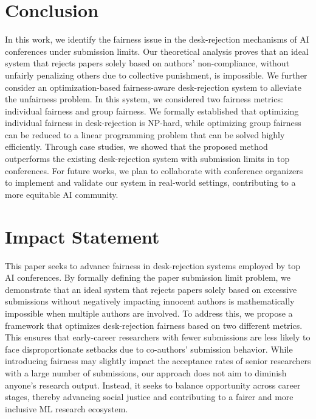 \section{Conclusion} \label{sec:conclusion}

In this work, we identify the fairness issue in the desk-rejection mechanisms of AI conferences under submission limits.
Our theoretical analysis proves that an ideal system that rejects papers solely based on authors' non-compliance, without unfairly penalizing others due to collective punishment, is impossible. We further consider an optimization-based fairness-aware desk-rejection system to alleviate the unfairness problem. In this system, we considered two fairness metrics: individual fairness and group fairness. We formally established that optimizing individual fairness in desk-rejection is NP-hard, while optimizing group fairness can be reduced to a linear programming problem that can be solved highly efficiently. Through case studies, we showed that the proposed method outperforms the existing desk-rejection system with submission limits in top conferences. For future works, we plan to collaborate with conference organizers to implement and validate our system in real-world settings, contributing to a more equitable AI community. 

\ifdefined\isarxiv
\else
\clearpage
\section*{Impact Statement}
This paper seeks to advance fairness in desk-rejection systems employed by top AI conferences. By formally defining the paper submission limit problem, we demonstrate that an ideal system that rejects papers solely based on excessive submissions without negatively impacting innocent authors is mathematically impossible when multiple authors are involved. To address this, we propose a framework that optimizes desk-rejection fairness based on two different metrics. This ensures that early-career researchers with fewer submissions are less likely to face disproportionate setbacks due to co-authors' submission behavior. While introducing fairness may slightly impact the acceptance rates of senior researchers with a large number of submissions, our approach does not aim to diminish anyone’s research output. Instead, it seeks to balance opportunity across career stages, thereby advancing social justice and contributing to a fairer and more inclusive ML research ecosystem.
\fi